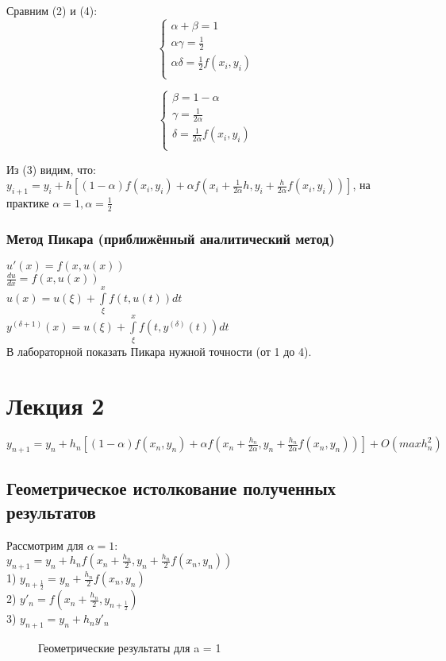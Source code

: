 Сравним (2) и (4):\\
\begin{equation}
\begin{cases}
\alpha + \beta = 1\\
\alpha \gamma = \frac{1}{2}\\
\alpha \delta = \frac{1}{2} f(x_{i}, y_{i})\\
\end{cases}
\end{equation}

\begin{equation}
\begin{cases}
\beta = 1 - \alpha\\
\gamma = \frac{1}{2\alpha}\\
\delta = \frac{1}{2\alpha} f(x_{i}, y_{i})\\
\end{cases}
\end{equation}

Из (3) видим, что:\\
$y_{i+1} = y_{i} + h[(1 - \alpha) f(x_{i}, y_{i}) + \alpha f(x_{i} + \frac{1}{2\alpha}h, y_{i} + \frac{h}{2\alpha}f(x_{i}, y_{i}))]$, на практике $\alpha = 1, \alpha = \frac{1}{2}$\\

\subsection{Метод Пикара (приближённый аналитический метод)}
$u'(x) = f(x, u(x))$\\
$\frac{du}{dx} = f(x, u(x))$\\
$u(x) = u(\xi) + \int\limits_{\xi}^{x} f(t, u(t)) dt$\\
$y^{(\delta + 1)}(x) = u(\xi) + \int\limits_{\xi}^{x} f(t, y^{(\delta)}(t)) dt$\\%

В лабораторной показать Пикара нужной точности (от 1 до 4).

\chapter{Лекция 2}
$y_{n+1} = y_{n} + h_{n}[(1 - \alpha)f(x_{n}, y_{n}) + \alpha f(x_{n} + \frac{h_{n}}{2\alpha}, y_{n} + \frac{h_{n}}{2\alpha} f (x_{n}, y_{n}))] + O(max h^{2}_{n})$
\section{Геометрическое истолкование полученных результатов}
Рассмотрим для $\alpha = 1$:\\
$y_{n+1} =  y_{n} + h_{n} f(x_{n} + \frac{h_{n}}{2}, y_{n} + \frac{h_{n}}{2} f (x_{n}, y_{n}))$\\
1) $y_{n + \frac{1}{2}} = y_{n} + \frac{h_{n}}{2} f(x_{n}, y_{n})$\\
2) $y'_{n} = f(x_{n} + \frac{h_{n}}{2}, y_{n + \frac{1}{2}})$\\
3) $y_{n + 1} = y_{n} + h_{n} y'_{n}$\\
\begin{figure}[H]
	\center{\texttt{[image: a\_1]}}
	\caption{Геометрические результаты для a = 1}
\end{figure}

